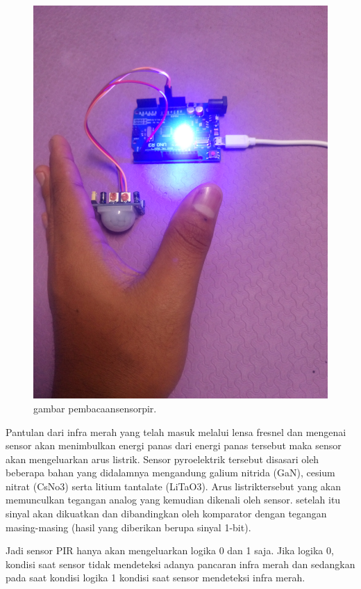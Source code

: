 \begin{figure}[ht]
\centerline{\includegraphics[width=1\textwidth]{figures/pembacaansensorpir.JPG}}
\caption{gambar pembacaansensorpir.}
\label{pembacaansensorpir.JPG}
\end{figure}

Pantulan dari infra merah yang telah masuk melalui lensa fresnel dan mengenai sensor akan menimbulkan energi panas dari energi panas tersebut maka sensor akan mengeluarkan arus listrik.
Sensor pyroelektrik tersebut disasari oleh beberapa bahan yang didalamnya mengandung galium nitrida (GaN), cesium nitrat (CsNo3) serta litium tantalate (LiTaO3).
Arus listriktersebut yang akan memunculkan tegangan analog yang kemudian dikenali oleh sensor. setelah itu sinyal akan dikuatkan dan dibandingkan oleh komparator dengan tegangan masing-masing (hasil yang diberikan berupa sinyal 1-bit).

Jadi sensor PIR hanya akan mengeluarkan logika 0 dan 1 saja. Jika logika 0, kondisi saat sensor tidak mendeteksi adanya pancaran infra merah dan sedangkan pada saat kondisi logika 1 kondisi saat sensor mendeteksi infra merah.

